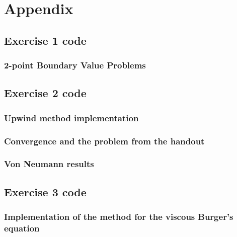 \documentclass[12pt, a4paper, titlepage]{article} %
\begin{document}
% 

%


\tableofcontents
\newpage






% 

\clearpage
\appendix
\section{Appendix}
\subsection{Exercise 1 code}
%
\subsubsection{2-point Boundary Value Problems}
%
%
\subsubsection{}
%

\subsection{Exercise 2 code}
%
\subsubsection{Upwind method implementation}
%
%
\subsubsection{Convergence and the problem from the handout}
%
%
\subsubsection{Von Neumann results}
%

\subsection{Exercise 3 code}
%
\subsubsection{Implementation of the method for the viscous Burger's equation}
%
%
\subsubsection{}
%
\end{document}
